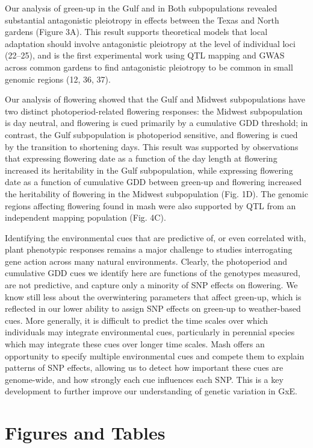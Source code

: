 \documentclass[
  9pt,
  twocolumn,
  twoside]{pnas-new}
\begin{document}
Our analysis of green-up in the Gulf and in Both subpopulations revealed
substantial antagonistic pleiotropy in effects between the Texas and
North gardens (Figure 3A). This result supports theoretical models that
local adaptation should involve antagonistic pleiotropy at the level of
individual loci (22--25), and is the first experimental work using QTL
mapping and GWAS across common gardens to find antagonistic pleiotropy
to be common in small genomic regions (12, 36, 37).

Our analysis of flowering showed that the Gulf and Midwest
subpopulations have two distinct photoperiod-related flowering
responses: the Midwest subpopulation is day neutral, and flowering is
cued primarily by a cumulative GDD threshold; in contrast, the Gulf
subpopulation is photoperiod sensitive, and flowering is cued by the
transition to shortening days. This result was supported by observations
that expressing flowering date as a function of the day length at
flowering increased its heritability in the Gulf subpopulation, while
expressing flowering date as a function of cumulative GDD between
green-up and flowering increased the heritability of flowering in the
Midwest subpopulation (Fig. 1D). The genomic regions affecting flowering
found in mash were also supported by QTL from an independent mapping
population (Fig. 4C).

Identifying the environmental cues that are predictive of, or even
correlated with, plant phenotypic responses remains a major challenge to
studies interrogating gene action across many natural environments.
Clearly, the photoperiod and cumulative GDD cues we identify here are
functions of the genotypes measured, are not predictive, and capture
only a minority of SNP effects on flowering. We know still less about
the overwintering parameters that affect green-up, which is reflected in
our lower ability to assign SNP effects on green-up to weather-based
cues. More generally, it is difficult to predict the time scales over
which individuals may integrate environmental cues, particularly in
perennial species which may integrate these cues over longer time
scales. Mash offers an opportunity to specify multiple environmental
cues and compete them to explain patterns of SNP effects, allowing us to
detect how important these cues are genome-wide, and how strongly each
cue influences each SNP. This is a key development to further improve
our understanding of genetic variation in GxE.

\section{Figures and Tables}\label{figures-and-tables}
\end{document}
